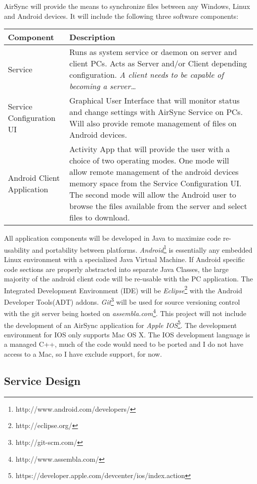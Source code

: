 \documentclass[12pt,draft]{article}
\begin{document}
AirSync will provide the means to synchronize files between any Windows, Linux and Android devices. It will include the following three software components: 
\normalsize
\begin{center}
\begin{tabular}{|l|p{7.5cm}|}
\hline
	\textbf{Component} & \textbf{Description} \\
\hline
	Service 
	& Runs as system service or daemon on server and client PCs. Acts as Server and/or Client depending configuration. \emph{A client needs to be capable of becoming a server\ldots} \\
\hline 
	Service Configuration UI & Graphical User Interface that will monitor status and change settings with AirSync Service on PCs. Will also provide remote management of files on Android devices.\\
\hline
	Android Client Application & Activity App that will provide the user with a choice of two operating modes. One mode will allow remote management of the android devices memory space from the Service Configuration UI. The second mode will allow the Android user to browse the files available from the server and select files to download.\\
\hline
\end{tabular}
\end{center}
\normalsize
All application components will be developed in Java to maximize code re-usability and portability between platforms. \emph{Android}\footnote{http://www.android.com/developers/} is essentially any embedded Linux environment with a specialized Java Virtual Machine. If Android specific code sections are properly abstracted into separate Java Classes, the large majority of the android client code will be re-usable with the PC application. The Integrated Development Environment (IDE) will be \emph{Eclipse}\footnote{http://eclipse.org/} with the Android Developer Tools(ADT) addons. \emph{Git}\footnote{http://git-scm.com/} will be used for source versioning control with the git server being hosted on \emph{assembla.com}\footnote{http://www.assembla.com/}. This project will not include the development of an AirSync application for \emph{Apple IOS}\footnote{https://developer.apple.com/devcenter/ios/index.action}. The development environment for IOS only supports Mac OS X. The IOS development language is a managed C++, much of the code would need to be ported and I do not have access to a Mac, so I have exclude support, for now. 

\subsection{Service Design}
\end{document}
